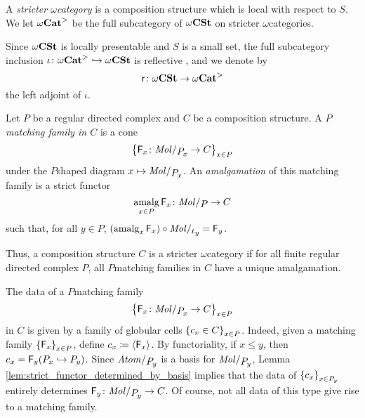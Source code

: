 \begin{dfn} \label{dfn:stricter_omega_cat}
    A \emph{stricter \( \omega \)\nbd category} is a composition structure which is local with respect to \( S \).
    We let \( {\omega\mathbf{Cat}}^> \) be the full subcategory of \( \omega\mathbf{CSt} \) on stricter \( \omega \)\nbd categories.
\end{dfn}

\noindent Since \( \omega\mathbf{CSt} \) is locally presentable and \( S \) is a small set, the full subcategory inclusion \( \iota \colon {\omega\mathbf{Cat}}^> \hookrightarrow \omega\mathbf{CSt} \) is reflective \cite{freyd1972continuous}, and we denote by 
\begin{equation*}
    \mathsf{r} \colon \omega\mathbf{CSt} \to {\omega\mathbf{Cat}}^>
\end{equation*}
the left adjoint of \( \iota \).

\begin{dfn} 
    Let \( P \) be a regular directed complex and \( C \) be a composition structure.
    A \emph{\( P \)\nbd matching family in \( C \)} is a cone 
    \begin{equation*}
        \set{\F_x \colon \molecin{\imel{P}{x}} \to C}_{x \in P}
    \end{equation*}
    under the \( P \)\nbd shaped diagram \( x \mapsto \molecin{\imel{P}{x}} \).    
    An \emph{amalgamation} of this matching family is a strict functor 
    \begin{equation*}
        \amalg_{x\in P} \F_x \colon \molecin{P} \to C
    \end{equation*}
    such that, for all \( y \in P \), \( (\amalg_x \F_x) \after \molecin{\mapel{y}} = \F_y \).
\end{dfn}

\begin{rmk}
    Thus, a composition structure \( C \) is a stricter \( \omega \)\nbd category if for all finite regular directed complex \( P \), all \( P \)\nbd matching families in \( C \) have a unique amalgamation.
\end{rmk}

\begin{rmk}\label{rmk:data_matching family}
    The data of a \( P \)\nbd matching family 
    \begin{equation*}
        \set{\F_x \colon \molecin{\imel{P}{x}} \to C}_{x \in P}
    \end{equation*}
    in \( C \) is given by a family of globular cells \( \left\{ {c_x \in C} \right\}_{x \in P} \).
    Indeed, given a matching family \( \left\{ {\mathsf{F}_x} \right\}_{x \in P} \), define \( c_x \coloneqq \langle\mathsf{F}_x\rangle \).
    By functoriality, if \( x \le y \), then \( c_x = \mathsf{F}_y({P}_{x} \hookrightarrow {P}_{y}) \).
    Since \( \atomin{\imel{P}{y}} \) is a basis for \( \molecin{\imel{P}{y}} \), Lemma \ref{lem:strict_functor_determined_by_basis} implies that the data of \( \left\{ {c_x} \right\}_{x \in {P}_{y}} \) entirely determines \( \F_y \colon \molecin{\imel{P}{y}} \to C \).
    Of course, not all data of this type give rise to a matching family. 
\end{rmk}

